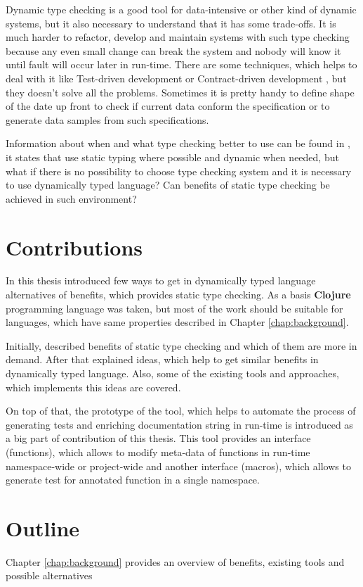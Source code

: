Dynamic type checking is a good tool for data-intensive or other kind of dynamic
systems, but it also necessary to understand that it has some trade-offs. It is
much harder to refactor, develop and maintain systems with such type checking
because any even small change can break the system and nobody will know it until
fault will occur later in run-time. There are some techniques, which helps to
deal with it like Test-driven development \cite{beck2003test} or Contract-driven
development \cite{meyer2007contract}, but they doesn't solve all the problems.
Sometimes it is pretty handy to define shape of the date up front to check if
current data conform the specification or to generate data samples from such
specifications.

Information about when and what type checking better to use can be found in
\cite{meijer2004static}, it states that use static typing where possible and
dynamic when needed, but what if there is no possibility to choose type checking
system and it is necessary to use dynamically typed language? Can benefits of
static type checking be achieved in such environment?


\section{Contributions}
In this thesis introduced few ways to get in dynamically typed language
alternatives of benefits, which provides static type checking. As a basis
\textbf{Clojure} programming language was taken, but most of the work should be
suitable for languages, which have same properties described in Chapter
\ref{chap:background}.

Initially, described benefits of static type checking and which of them are more
in demand. After that explained ideas, which help to get similar benefits in
dynamically typed language. Also, some of the existing tools and approaches,
which implements this ideas are covered.

On top of that, the prototype of the tool, which helps to automate the process
of generating tests and enriching documentation string in run-time is introduced
as a big part of contribution of this thesis. This tool provides an interface
(functions), which allows to modify meta-data of functions in run-time
namespace-wide or project-wide and another interface (macros), which allows to
generate test for annotated function in a single namespace.

\section{Outline}
Chapter \ref{chap:background} provides an overview of benefits, existing tools
and possible alternatives






